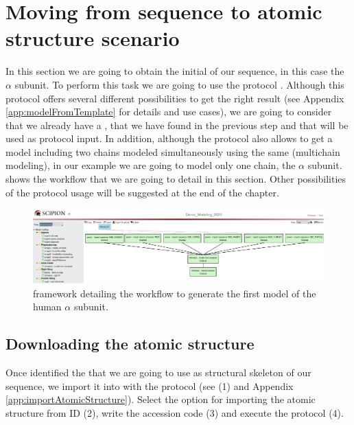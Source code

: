 \section{Moving from sequence to atomic structure scenario}
In this section we are going to obtain the initial  of our  sequence, in this case the  $\alpha$ subunit. To perform this task we are going to use the \scipion protocol . Although this protocol offers several different possibilities to get the right result (see Appendix \ref{app:modelFromTemplate} for details and use cases), we are going to consider that we already have a , that we have found in the previous step and that will be used as protocol input. In addition, although the protocol also allows to get a model including two chains modeled simultaneously using the same  (multichain modeling), in our example we are going to model only one chain, the  $\alpha$ subunit.  shows the \scipion workflow that we are going to detail in this section. Other possibilities of the protocol usage will be suggested at the end of the chapter.
\begin{figure}[H]
  \centering 
  \captionsetup{width=.9\linewidth} 
  \includegraphics[width=1\textwidth]{Images/Fig66}
  \caption{\scipion framework detailing the workflow to generate the first model of the human  $\alpha$ subunit.}
  \label{fig:scipion_workflow_from_sequence}
  \end{figure}
\subsection*{Downloading the atomic structure}
  
  Once identified the  that we are going to use as structural skeleton of our sequence, we import it into \scipion with the protocol  (see  (1) and Appendix \ref{app:importAtomicStructure}). Select the option for importing the atomic structure from ID (2), write the  accession code (3) and execute the protocol (4). 
  
